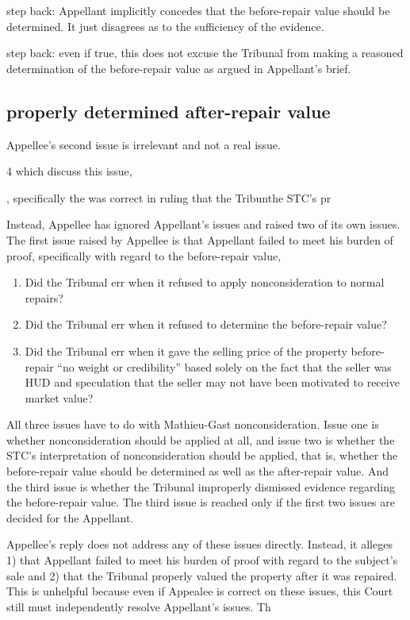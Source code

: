 \documentclass[12pt,\documentclassflag]{michiganCourtOfAppealsBrief}
\begin{document}
step back: Appellant implicitly concedes that the before-repair value should be determined. It just disagrees as to the sufficiency of the evidence.

step back: even if true, this does not excuse the Tribunal from making a reasoned determination of the before-repair value as argued in Appellant's brief.

\subsection{properly determined after-repair value}

Appellee's second issue is irrelevant and not a real issue.



4 which discuss this issue, 

, specifically the was correct in ruling that the Tribunthe STC's pr




Instead, Appellee has ignored Appellant's issues and raised two of its own issues. The first issue raised by Appellee is that Appellant failed to meet his burden of proof, specifically with regard to the before-repair value,


\begin{enumerate}
  \item Did the Tribunal err when it refused to apply nonconsideration to normal repairs?
\item Did the Tribunal err when it refused to determine the before-repair value?
\item Did the Tribunal err when it gave the selling price of the property before-repair ``no weight or credibility'' based solely on the fact that the seller was HUD and speculation that the seller may not have been motivated to receive market value?
\end{enumerate}



All three issues have to do with Mathieu-Gast nonconsideration. Issue one is whether nonconsideration should be applied at all, and issue two is whether the STC's interpretation of nonconsideration should be applied, that is, whether the before-repair value should be determined as well as the after-repair value. And the third issue is whether the Tribunal improperly dismissed evidence regarding the before-repair value. The third issue is reached only if the first two issues are decided for the Appellant.

Appellee's reply does not address any of these issues directly. Instead, it alleges 1) that Appellant failed to meet his burden of proof with regard to the subject's sale and 2) that the Tribunal properly valued the property after it was repaired. This is unhelpful because even if Appealee is correct on these issues, this Court still must independently resolve Appellant's issues. Th
\end{document}
